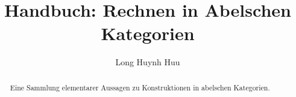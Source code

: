 \documentclass[3p]{elsarticle}
\title{Handbuch: Rechnen in Abelschen Kategorien}
\author{Long Huynh Huu}
\begin{document}
\maketitle
\tableofcontents


\begin{abstract}
Eine Sammlung elementarer Aussagen zu Konstruktionen in abelschen Kategorien.
\end{abstract}





\end{document}
